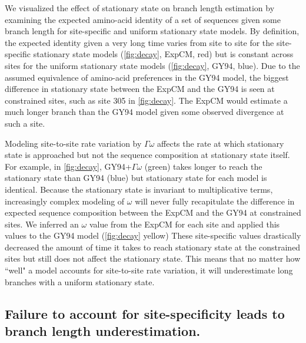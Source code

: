\documentclass[11pt]{article}
\begin{document}
We visualized the effect of stationary state on branch length estimation by examining the expected amino-acid identity of a set of sequences given some branch length for site-specific and uniform stationary state models. 
By definition, the expected identity given a very long time varies from site to site for the site-specific stationary state models (\ref{fig:decay}, ExpCM, red) but is constant across sites for the uniform stationary state models (\ref{fig:decay}, GY94, blue). 
Due to the assumed equivalence of amino-acid preferences in the GY94 model, the biggest difference in stationary state between the ExpCM and the GY94 is seen at constrained sites, such as site 305 in \ref{fig:decay}. 
The ExpCM would estimate a much longer branch than the GY94 model given some observed divergence at such a site. 

Modeling site-to-site rate variation by $\Gamma\omega$ affects the rate at which stationary state is approached but not the sequence composition at stationary state itself. 
For example, in \ref{fig:decay}, GY94+$\Gamma\omega$ (green) takes longer to reach the stationary state than GY94 (blue) but stationary state for each model is identical. 
Because the stationary state is invariant to multiplicative terms, increasingly complex modeling of $\omega$ will never fully recapitulate the difference in expected sequence composition between the ExpCM and the GY94 at constrained sites. 
We inferred an $\omega$ value from the ExpCM for each site \citep{spielman2015relationship} and applied this values to the GY94 model (\ref{fig:decay} yellow)
These site-specific values drastically decreased the amount of time it takes to reach stationary state at the constrained sites but still does not affect the stationary state. 
This means that no matter how ``well" a model accounts for site-to-site rate variation, it will underestimate long branches with a uniform stationary state. 

\subsection*{Failure to account for site-specificity leads to branch length underestimation.}
\end{document}
